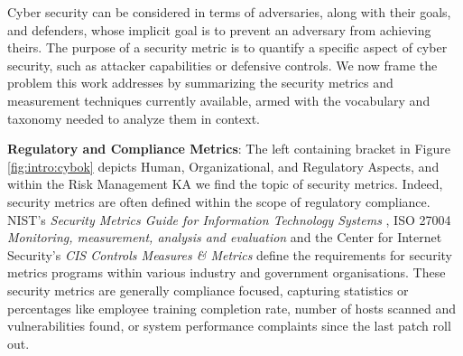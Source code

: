 
Cyber security can be considered in terms of adversaries, along with their goals, and defenders, whose implicit goal is to prevent an adversary from achieving theirs. The purpose of a security metric is to quantify a specific aspect of cyber security, such as attacker
capabilities or defensive controls. We now frame the problem this work addresses by summarizing the security metrics and measurement techniques currently available, armed with the vocabulary and taxonomy needed to analyze them in context. 

\textbf{Regulatory and Compliance Metrics}: The left containing bracket in Figure \ref{fig:intro:cybok} depicts Human, Organizational, and Regulatory Aspects, and within the Risk Management KA\cite{Burnap_2019} we find the topic of security metrics. Indeed, security metrics are often defined within the scope of regulatory compliance. NIST's \textit{Security Metrics Guide for Information Technology Systems} \cite{Swanson_Bartol_Sabato_Hash_Graffo_2003,Chew_Swanson_Stine_Bartol_Brown_Robinson_2008}, ISO 27004 \textit{Monitoring, measurement, analysis and evaluation}\cite{iso_27004} and the Center for Internet Security's \textit{CIS Controls Measures \& Metrics}\cite{cis_cic} define the requirements for security metrics programs within various industry and government organisations. These security metrics are generally compliance focused, capturing statistics or percentages like employee training completion rate, number of hosts scanned and vulnerabilities found, or system performance complaints since the last patch roll out. 

